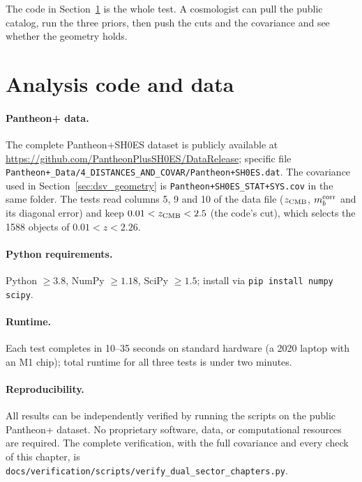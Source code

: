 The code in Section~\ref{sec:dsv_code} is the whole test. A cosmologist can pull the public catalog, run the three priors, then push the cuts and the covariance and see whether the geometry holds.

\section{Analysis code and data}\label{sec:dsv_code}
\paragraph{Pantheon+ data.} The complete Pantheon+SH0ES dataset is publicly available at \url{https://github.com/PantheonPlusSH0ES/DataRelease}; specific file
\texttt{Pantheon+\_Data/\allowbreak{}4\_DISTANCES\_AND\_COVAR/\allowbreak{}Pantheon+SH0ES.dat}. The covariance used in Section~\ref{sec:dsv_geometry} is
\texttt{Pantheon+SH0ES\_STAT+SYS.cov} in the same folder. The tests read columns 5, 9 and 10 of the data file ($z_{\rm CMB}$, $m_b^{\rm corr}$ and its
diagonal error) and keep $0.01<z_{\rm CMB}<2.5$ (the code's cut), which selects the 1588 objects of $0.01<z<2.26$.
\paragraph{Python requirements.} Python $\ge3.8$, NumPy $\ge1.18$, SciPy $\ge1.5$; install via \texttt{pip install numpy scipy}.
\paragraph{Runtime.} Each test completes in 10--35 seconds on standard hardware (a 2020 laptop with an M1 chip); total runtime for all three tests is under two
minutes.
\paragraph{Reproducibility.} All results can be independently verified by running the scripts on the public Pantheon+ dataset. No proprietary software,
data, or computational resources are required. The complete verification, with the full covariance and every check of this chapter, is
\texttt{docs/\allowbreak{}verification/\allowbreak{}scripts/\allowbreak{}verify\_dual\_sector\_chapters.py}.

